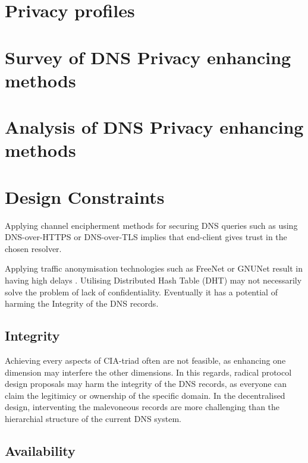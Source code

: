 \documentclass[a4paper,12pt]{article}
\begin{document}
\newpage
\section{Privacy profiles}


\newpage
\section{Survey of DNS Privacy enhancing methods}


\newpage
\section{Analysis of DNS Privacy enhancing methods}

\newpage

\section{Design Constraints}
Applying channel encipherment methods for securing DNS queries such as using DNS-over-HTTPS or DNS-over-TLS implies that end-client gives trust in the chosen resolver.

Applying traffic anonymisation technologies such as FreeNet \cite{clarke2001freenet} or GNUNet\cite{grothoff2017gnunet} result in having high delays \cite{anonymousoverdns}.
Utilising Distributed Hash Table (DHT) may not necessarily solve the problem of lack of confidentiality. Eventually it has a potential of harming the Integrity of the DNS records.

\subsection{Integrity}
Achieving every aspects of CIA-triad often are not feasible, as enhancing one dimension may interfere the other dimensions.
In this regards, radical protocol design proposals may harm the integrity of the DNS records, as everyone can claim the legitimicy or ownership of the specific domain.
In the decentralised design, interventing the malevoneous records are more challenging than the hierarchial structure of the current DNS system. 

\subsection{Availability}
\newpage
%
\end{document}
